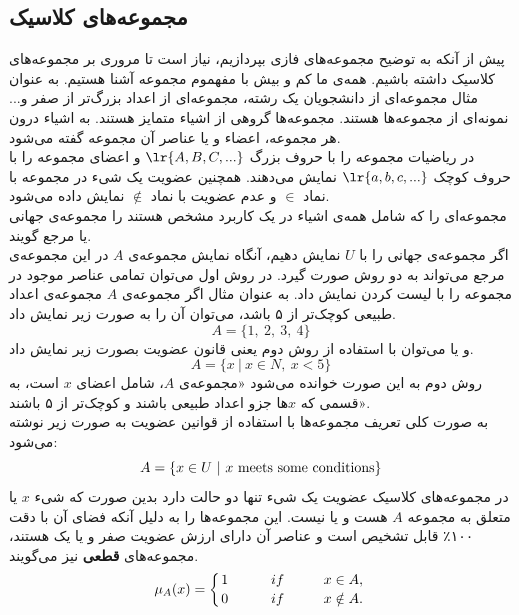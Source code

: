 \documentclass[12pt,a4paper]{article}
\theoremstyle{definition}
\begin{document}
 \subsection{مجموعه‌های کلاسیک}
پیش از آنکه به توضیح مجموعه‌های فازی بپردازیم، نیاز است تا مروری بر مجموعه‌های کلاسیک داشته باشیم. همه‌ی ما کم و بیش با مفهموم مجموعه آشنا هستیم. به عنوان مثال مجموعه‌ای از دانشجویان یک رشته، مجموعه‌ای از اعداد بزرگ‌تر از صفر و... نمونه‌ای از مجموعه‌ها هستند. مجموعه‌ها گروهی از اشیاء متمایز هستند. به اشیاء درون هر مجموعه، اعضاء و یا عناصر آن مجموعه گفته می‌شود. \\
در ریاضیات مجموعه را با حروف بزرگ 
$\lr{A,B,C,...}$
 و اعضای مجموعه را با حروف کوچک 
$\lr{a,b,c,...} $
  نمایش می‌دهند. همچنین عضویت یک شیء در مجموعه با نماد 
$\in$
 و عدم عضویت با نماد
 $\notin$
 نمایش داده می‌شود. 
 \cite{Bojadziev2007}
 \\
مجموعه‌ای را که شامل همه‌ی اشیاء در یک کاربرد مشخص هستند را مجموعه‌ی جهانی 
یا مرجع گویند. \\
اگر مجموعه‌ی جهانی را با $ U $  نمایش دهیم، آنگاه نمایش مجموعه‌ی $ A $  در این مجموعه‌ی مرجع می‌تواند به دو روش صورت گیرد. در روش اول می‌توان تمامی عناصر موجود در مجموعه را با لیست کردن 
نمایش داد. به عنوان مثال اگر مجموعه‌ی $ A $ مجموعه‌ی اعداد طبیعی کوچک‌تر از ۵ باشد، می‌توان آن را به صورت زیر نمایش داد.
\begin{equation}
A=\{1,\ 2,\ 3,\ 4\}
\end{equation}
و یا می‌توان با استفاده از روش دوم یعنی قانون عضویت
بصورت زیر نمایش داد.
\cite{Wang1997}
\begin{equation}
 A= \{ x\ |\ x \in N,\ x < 5\} 
 \end{equation}
 روش دوم به این صورت خوانده می‌شود «مجموعه‌ی $ A $، شامل اعضای $ x $ است، به قسمی که  $ x $ها جزو اعداد طبیعی باشند و کوچک‌تر از ۵ باشند».\\
 به صورت کلی تعریف مجموعه‌ها با استفاده از قوانین عضویت به صورت زیر نوشته می‌شود:
\begin{equation}
 A= \{  x \in U\ |\   x\ {\rm meets\ some\ conditions } \}
 \end{equation} 
 در مجموعه‌های کلاسیک عضویت یک شیء تنها دو حالت دارد بدین صورت که شیء $x$ یا متعلق به مجموعه $A$ هست و یا نیست. این مجموعه‌ها را به دلیل آنکه فضای آن با دقت ۱۰۰٪ قابل تشخیص است و عناصر آن دارای ارزش عضویت صفر و یا یک هستند، مجموعه‌های
  \textbf{قطعی}
  نیز می‌گویند. 
\begin{equation}\label{f_2}
\mu_{A}(x)=\left \{ 
	{1 \atop 0}
	\hskip 1cm
   {if \hskip 1cm x \in A, \atop
	if \hskip 1cm x \notin A.} \right.
\end{equation} 
\end{document}
